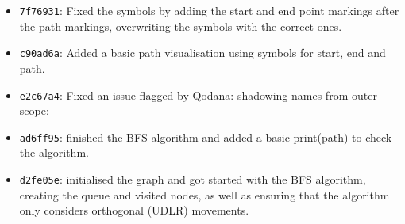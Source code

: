\begin{itemize}
	\item \texttt{7f76931}: Fixed the symbols by adding the start and end point markings after the path markings, overwriting the symbols with the correct ones.
	\item \texttt{c90ad6a}: Added a basic path visualisation using symbols for start, end and path.
	\item \texttt{e2c67a4}: Fixed an issue flagged by Qodana: shadowing names from outer scope:
	\item \texttt{ad6ff95}: finished the BFS algorithm and added a basic print(path) to check the algorithm.
	\item \texttt{d2fe05e}: initialised the graph and got started with the BFS algorithm, creating the queue and visited nodes, as well as ensuring that the algorithm only considers orthogonal (UDLR) movements.
\end{itemize}